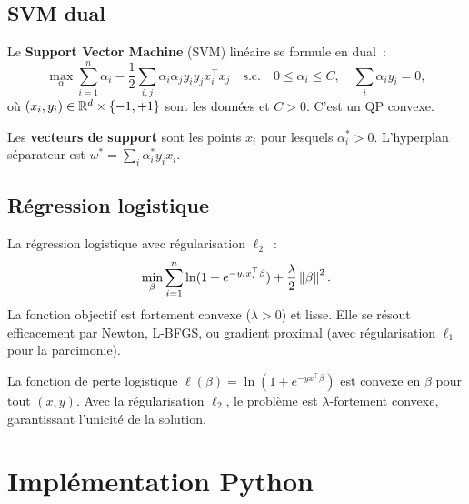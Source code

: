 \subsection{SVM dual}

\begin{definition}
Le \textbf{Support Vector Machine} (SVM) lin\'eaire se formule en dual~:
\[
  \max_\alpha \sum_{i=1}^n \alpha_i
  - \frac{1}{2} \sum_{i,j} \alpha_i \alpha_j y_i y_j x_i^\top x_j
  \quad \text{s.c.} \quad
  0 \leq \alpha_i \leq C, \quad \sum_i \alpha_i y_i = 0,
\]
o\`u $(x_i, y_i) \in \mathbb{R}^d \times \{-1, +1\}$ sont les donn\'ees et $C > 0$.
C'est un QP convexe.
\end{definition}

\begin{proposition}
Les \textbf{vecteurs de support} sont les points $x_i$ pour lesquels
$\alpha_i^* > 0$. L'hyperplan s\'eparateur est $w^* = \sum_i \alpha_i^*
y_i x_i$.
\end{proposition}

\subsection{R\'egression logistique}

\begin{definition}
La r\'egression logistique avec r\'egularisation $\ell_2$~:
\[
  \min_\beta \sum_{i=1}^n \ln(1 + e^{-y_i x_i^\top \beta})
  + \frac{\lambda}{2} \left\| \beta \right\|^2.
\]
La fonction objectif est fortement convexe ($\lambda > 0$) et lisse.
Elle se r\'esout efficacement par Newton, L-BFGS, ou gradient proximal
(avec r\'egularisation $\ell_1$ pour la parcimonie).
\end{definition}

\begin{theoreme}
La fonction de perte logistique $\ell(\beta) = \ln(1 + e^{-y x^\top \beta})$
est convexe en $\beta$ pour tout $(x, y)$. Avec la r\'egularisation $\ell_2$,
le probl\`eme est $\lambda$-fortement convexe, garantissant l'unicit\'e de la
solution.
\end{theoreme}

\section{Impl\'ementation Python}

